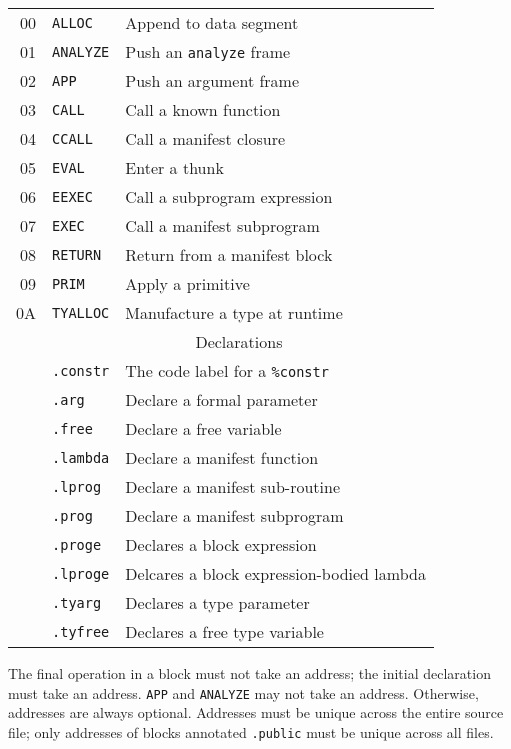 \documentclass{article}
\begin{document}
\begin{tabular}{rl@{ --- }l}
  00 & \texttt{ALLOC} & Append to data segment \\
  01 & \texttt{ANALYZE} & Push an \texttt{analyze} frame \\
  02 & \texttt{APP} & Push an argument frame \\
  03 & \texttt{CALL} & Call a known function \\
  04 & \texttt{CCALL} & Call a manifest closure \\
  05 & \texttt{EVAL} & Enter a thunk \\
  06 & \texttt{EEXEC} & Call a subprogram expression \\
  07 & \texttt{EXEC} & Call a manifest subprogram \\
  08 & \texttt{RETURN} & Return from a manifest block \\
  09 & \texttt{PRIM} & Apply a primitive \\
  0A & \texttt{TYALLOC} & Manufacture a type at runtime \\
  & \multicolumn{2}{c}{Declarations} \\
  & \texttt{.constr} & The code label for a \texttt{\%constr} \\
  & \texttt{.arg} & Declare a formal parameter \\
  & \texttt{.free} & Declare a free variable \\
  & \texttt{.lambda} & Declare a manifest function \\
  & \texttt{.lprog} & Declare a manifest sub-routine \\
  & \texttt{.prog} & Declare a manifest subprogram \\
  & \texttt{.proge} & Declares a block expression \\
  & \texttt{.lproge} & Delcares a block expression-bodied lambda \\
  & \texttt{.tyarg} & Declares a type parameter \\
  & \texttt{.tyfree} & Declares a free type variable \\
\end{tabular}

The final operation in a block must not take an address; the initial declaration must take an address.
\texttt{APP} and \texttt{ANALYZE} may not take an address.
Otherwise, addresses are always optional.
Addresses must be unique across the entire source file;
only addresses of blocks annotated \texttt{.public} must be unique across all files.

\end{document}
